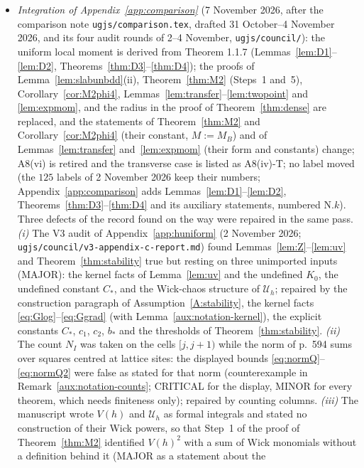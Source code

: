 \documentclass[11pt,a4paper]{article}
\theoremstyle{plain}
\theoremstyle{definition}
\theoremstyle{plain}
\theoremstyle{definition}
\begin{document}
\begin{itemize}
declared absent) and its covariance description is corrected from ``Dirichlet'' to ``decoupled''.
\item \emph{Integration of Appendix~\ref{app:comparison}} (7 November 2026, after the
comparison note \texttt{ugjs/comparison.tex}, drafted 31 October--4 November 2026, and its four
audit rounds of 2--4 November, \texttt{ugjs/council/}): the uniform local moment is derived from Theorem 1.1.7
(Lemmas~\ref{lem:D1}--\ref{lem:D2}, Theorems~\ref{thm:D3}--\ref{thm:D4}); the proofs of
Lemma~\ref{lem:slabunbdd}(ii), Theorem~\ref{thm:M2} (Steps~1 and~5),
Corollary~\ref{cor:M2phi4}, Lemmas~\ref{lem:transfer}--\ref{lem:twopoint} and
\ref{lem:expmom}, and the radius in the proof of Theorem~\ref{thm:dense} are replaced, and the
statements of Theorem~\ref{thm:M2} and Corollary~\ref{cor:M2phi4} (their constant, $M:=M_B$)
and of Lemmas~\ref{lem:transfer} and~\ref{lem:expmom} (their form and constants) change;
A8(vi) is retired and the transverse case is listed as A8(iv)-T; no label moved
(the $125$ labels of 2 November 2026 keep their numbers; Appendix~\ref{app:comparison} adds
Lemmas~\ref{lem:D1}--\ref{lem:D2}, Theorems~\ref{thm:D3}--\ref{thm:D4} and its auxiliary
statements, numbered N.$k$).  Three defects of the record found on the way were repaired
in the same pass.  \emph{(i)} The V3 audit of Appendix~\ref{app:huniform} (2 November
2026; \texttt{ugjs/council/}\allowbreak\texttt{v3-appendix-c-report.md}) found Lemmas~\ref{lem:Z}--\ref{lem:uv}
and Theorem~\ref{thm:stability} true but resting on three unimported inputs (MAJOR): the
kernel facts of Lemma~\ref{lem:uv} and the undefined $K_0$, the undefined constant $C_*$,
and the Wick-chaos structure of $\mathcal U_h$; repaired by the construction paragraph of
Assumption~\ref{A:stability}, the kernel facts \eqref{eq:Glog}--\eqref{eq:Ggrad} (with
Lemma~\ref{aux:notation-kernel}), the explicit constants $C_*$, $c_1$, $c_2$, $b_*$ and the
thresholds of Theorem~\ref{thm:stability}.  \emph{(ii)} The count $N_I$ was taken on the
cells $[j,j+1)$ while the norm of p.~594 sums over squares centred at lattice sites: the
displayed bounds \eqref{eq:normQ}--\eqref{eq:normQ2} were false as stated for that norm
(counterexample in Remark~\ref{aux:notation-counts}; CRITICAL for the display, MINOR for every
theorem, which needs finiteness only); repaired by counting columns.  \emph{(iii)} The
manuscript wrote $V(h)$ and $\mathcal U_h$ as formal integrals and stated no construction of
their Wick powers, so that Step~1 of the proof of Theorem~\ref{thm:M2} identified $V(h)^2$
with a sum of Wick monomials without a definition behind it (MAJOR as a statement about the

\end{itemize}
\end{document}
